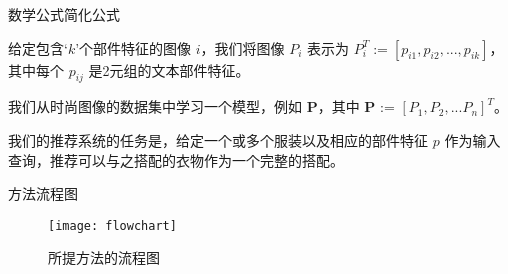 \documentclass[10pt]{beamer}
\begin{document}
\begin{frame}{数学公式}{简化公式}
\begin{block}{}
给定包含`$k$'个部件特征的图像 $i$，我们将图像 $P_i$ 表示为 $P_i^{T} := [p_{i1}, p_{i2}, ..., p_{ik}]$，其中每个 $p_{ij}$ 是2元组的文本部件特征。
\end{block}
\pause
\begin{block}{}
我们从时尚图像的数据集中学习一个模型，例如 \textbf{P}，其中 \textbf{P} := $[P_1, P_2, ... P_n]^{T}$。
\end{block}
\pause
\begin{block}{}
我们的推荐系统的任务是，给定一个或多个服装以及相应的部件特征 $p$ 作为输入查询，推荐可以与之搭配的衣物作为一个完整的搭配。
\end{block}
\end{frame}


\begin{frame}{方法}{流程图}
\begin{figure}[t]
    \centering
    \texttt{[image: flowchart]}
    \caption{所提方法的流程图}
  \end{figure}
\end{frame}
\end{document}
